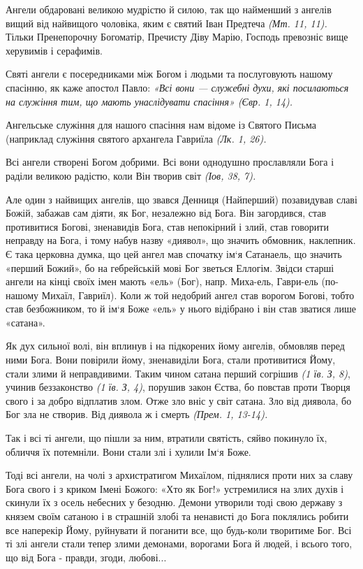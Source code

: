 \documentclass[main.tex]{subfiles}
\begin{document}
Ангели обдаровані великою мудрістю й силою, так що найменший з ангелів вищий від найвищого чоловіка, яким є святий Іван Предтеча \emph{(Мт. 11, 11).} Тільки Пренепорочну Богоматір, Пречисту Діву Марію, Господь превозніс вище херувимів і серафимів.

Святі ангели є посередниками між Богом і людьми та послуговують нашому спасінню, як каже апостол Павло: \emph{«Всі вони — служебні духи, які посилаються на служіння тим, що мають унаслідувати спасіння» (Євр. 1, 14).}

Ангельське служіння для нашого спасіння нам відоме із Святого Письма (наприклад служіння святого архангела Гавриїла \emph{(Лк. 1, 26).}

Всі ангели створені Богом добрими. Всі вони однодушно прославляли Бога і раділи великою радістю, коли Він творив світ \emph{(Іов, 38, 7).}

Але один з найвищих ангелів, що звався Денниця (Найперший) позавидував славі Божій, забажав сам діяти, як Бог, незалежно від Бога. Він загордився, став противитися Богові, зненавидів Бога, став непокірний і злий, став говорити неправду на Бога, і тому набув назву «диявол», що значить обмовник, наклепник. Є така церковна думка, що цей ангел мав спочатку ім`я Сатанаель, що значить «перший Божий», бо на гебрейській мові Бог зветься Еллогім. Звідси старші ангели на кінці своїх імен мають «ель» (Бог), напр. Миха-ель, Гаври-ель (по-нашому Михаїл, Гавриїл). Коли ж той недобрий ангел став ворогом Богові, тобто став безбожником, то й ім`я Боже «ель» у нього відібрано і він став зватися лише «сатана».

Як дух сильної волі, він вплинув і на підкорених йому ангелів, обмовляв перед ними Бога. Вони повірили йому, зненавиділи Бога, стали противитися Йому, стали злими й неправдивими. Таким чином сатана перший согрішив \emph{(1 їв. З, 8)}, учинив беззаконство \emph{(1 їв. З, 4)}, порушив закон Єства, бо повстав проти Творця свого і за добро відплатив злом. Отже зло вніс у світ сатана. Зло від диявола, бо Бог зла не створив. Від диявола ж і смерть \emph{(Прем. 1, 13-14).}

Так і всі ті ангели, що пішли за ним, втратили святість, сяйво покинуло їх, обличчя їх потемніли. Вони стали злі і хулили Ім`я Боже.

Тоді всі ангели, на чолі з архистратигом Михаїлом, піднялися проти них за славу Бога свого і з криком Імені Божого: «Хто як Бог!» устремилися на злих духів і скинули їх з осель небесних у безодню. Демони утворили тоді свою державу з князем своїм сатаною і в страшній злобі та ненависті до Бога поклялись робити все наперекір Йому, руйнувати й поганити все, що будь-коли творитиме Бог. Всі ті злі ангели стали тепер злими демонами, ворогами Бога й людей, і всього того, що від Бога - правди, згоди, любові...
\end{document}
